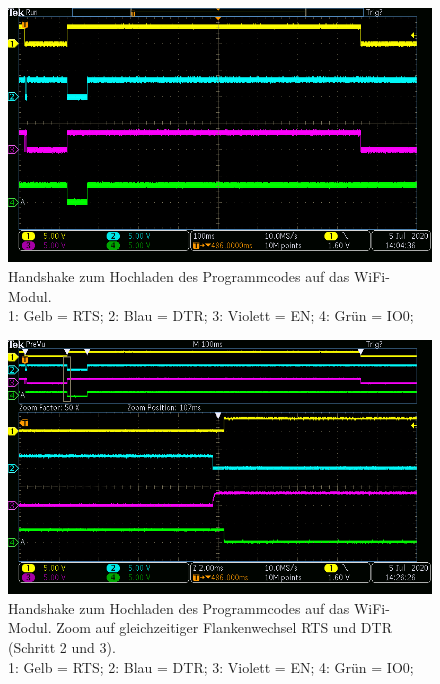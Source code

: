\begin{figure}[H]
\center
\includegraphics[width = \textwidth]{graphics/ESP32_RTS_DTR_EN_IO0_gesamt}
\caption{Handshake zum Hochladen des Programmcodes auf das WiFi-Modul. \\\hspace{\textwidth}1: Gelb = RTS; 2: Blau = DTR; 3: Violett = EN; 4: Grün = IO0;}
\label{fig:ESP32_RTS_DTR_EN_IO0_gesamt}
\end{figure}

\begin{figure}[H]
\center
\includegraphics[width = \textwidth]{graphics/ESP32_RTS_DTR_EN_IO0_2}
\caption{Handshake zum Hochladen des Programmcodes auf das WiFi-Modul. Zoom auf gleichzeitiger Flankenwechsel RTS und DTR (Schritt 2 und 3).\\\hspace{\textwidth}1: Gelb = RTS; 2: Blau = DTR; 3: Violett = EN; 4: Grün = IO0;}
\label{fig:ESP32_RTS_DTR_EN_IO0_2}
\end{figure}


